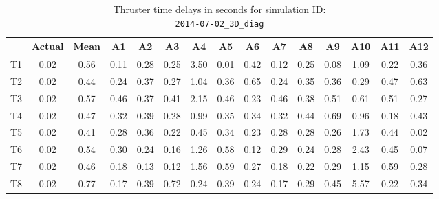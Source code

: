 \begin{table}[H]
\centering
\cprotect\caption{Thruster time delays in seconds for simulation ID:\\
\verb|2014-07-02_3D_diag|}
\begin{tabular}{|c|c|c|c|c|c|c|c|c|c|c|c|c|c|c|} \hline
~ & Actual & Mean & A1 & A2 & A3 & A4 & A5 & A6 & A7 & A8 & A9 & A10 & A11 & A12 \\ \hline
T1 & 0.02 & 0.56 & 0.11 & 0.28 & 0.25 & 3.50 & 0.01 & 0.42 & 0.12 & 0.25 & 0.08 & 1.09 & 0.22 & 0.36 \\
T2 & 0.02 & 0.44 & 0.24 & 0.37 & 0.27 & 1.04 & 0.36 & 0.65 & 0.24 & 0.35 & 0.36 & 0.29 & 0.47 & 0.63 \\
T3 & 0.02 & 0.57 & 0.46 & 0.37 & 0.41 & 2.15 & 0.46 & 0.23 & 0.46 & 0.38 & 0.51 & 0.61 & 0.51 & 0.27 \\
T4 & 0.02 & 0.47 & 0.32 & 0.39 & 0.28 & 0.99 & 0.35 & 0.34 & 0.32 & 0.44 & 0.69 & 0.96 & 0.18 & 0.43 \\
T5 & 0.02 & 0.41 & 0.28 & 0.36 & 0.22 & 0.45 & 0.34 & 0.23 & 0.28 & 0.28 & 0.26 & 1.73 & 0.44 & 0.02 \\
T6 & 0.02 & 0.54 & 0.30 & 0.24 & 0.16 & 1.26 & 0.58 & 0.12 & 0.29 & 0.24 & 0.28 & 2.43 & 0.45 & 0.07 \\
T7 & 0.02 & 0.46 & 0.18 & 0.13 & 0.12 & 1.56 & 0.59 & 0.27 & 0.18 & 0.22 & 0.29 & 1.15 & 0.59 & 0.28 \\
T8 & 0.02 & 0.77 & 0.17 & 0.39 & 0.72 & 0.24 & 0.39 & 0.24 & 0.17 & 0.29 & 0.45 & 5.57 & 0.22 & 0.34 \\ \hline
\end{tabular}
\label{delay-6}
\end{table}

